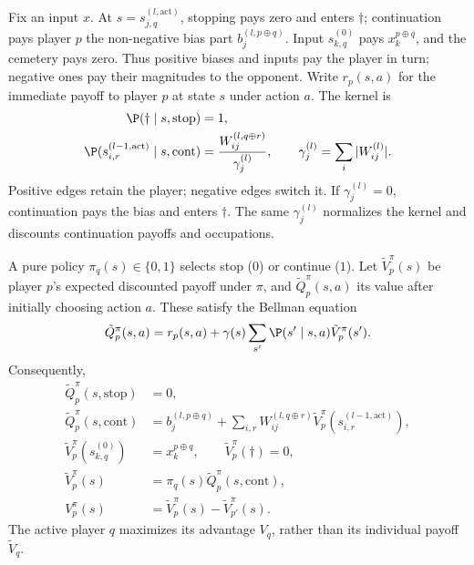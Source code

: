\begin{definition}\label{ptnb:def:adf-recursion}
Fix an input $x$. At $s=s_{j,q}^{(l,\mathrm{act})}$, stopping pays zero and enters $\dagger$;
continuation pays player $p$ the non-negative bias part $b_j^{(l,p\oplus q)}$.
Input $s_{k,q}^{(0)}$ pays $x_k^{p\oplus q}$, and the cemetery pays zero. Thus positive biases and
inputs pay the player in turn; negative ones pay their magnitudes to the opponent.
Write $r_p(s,a)$ for the immediate payoff to player $p$ at state $s$ under action $a$.
The kernel is
\begin{align}
    \P(\dagger\mid s,\mathrm{stop})&=1,\label{ptnb:eq:adf-kernel-stop}\\
    \P(s_{i,r}^{(l-1,\mathrm{act})}\mid s,\mathrm{cont})
        &=\frac{W_{ij}^{(l,q\oplus r)}}{\gamma_j^{(l)}},
    \qquad \gamma_j^{(l)}=\sum_i|W_{ij}^{(l)}|.\label{ptnb:eq:adf-kernel}
\end{align}
Positive edges retain the player; negative edges switch it. If $\gamma_j^{(l)}=0$, continuation
pays the bias and enters $\dagger$. The same $\gamma_j^{(l)}$ normalizes the kernel and discounts
continuation payoffs and occupations.

A pure policy $\pi_q(s)\in\{0,1\}$ selects stop ($0$) or continue ($1$).
Let $\tilde V_p^\pi(s)$ be player $p$'s expected discounted payoff under $\pi$, and $\tilde Q_p^\pi(s,a)$ its value after initially choosing action $a$. These satisfy the Bellman equation
\begin{equation}\label{ptnb:eq:adf-q-bellman}
    \tilde Q_p^\pi(s,a)=r_p(s,a)+\gamma(s)\sum_{s'}\P(s'\mid s,a)\tilde V_p^\pi(s').
\end{equation}
Consequently,
\begin{align}
    \tilde Q_p^\pi(s,\mathrm{stop})&=0,\label{ptnb:eq:adf-q-stop}\\
    \tilde Q_p^\pi(s,\mathrm{cont})
        &=b_j^{(l,p\oplus q)}+\sum_{i,r}W_{ij}^{(l,q\oplus r)}
            \tilde V_p^\pi(s_{i,r}^{(l-1,\mathrm{act})}),\label{ptnb:eq:adf-q-cont}\\
    \tilde V_p^\pi(s_{k,q}^{(0)})&=x_k^{p\oplus q},
        \qquad \tilde V_p^\pi(\dagger)=0,\label{ptnb:eq:adf-v-terminal}\\
    \tilde V_p^\pi(s)&=\pi_q(s)\tilde Q_p^\pi(s,\mathrm{cont}),\label{ptnb:eq:adf-v-active}\\
    V_p^\pi(s)&=\tilde V_p^\pi(s)-\tilde V_{p'}^\pi(s).\label{ptnb:eq:adf-advantage}
\end{align}
The active player $q$ maximizes its advantage $V_q$, rather than its individual payoff $\tilde V_q$.
\end{definition}

